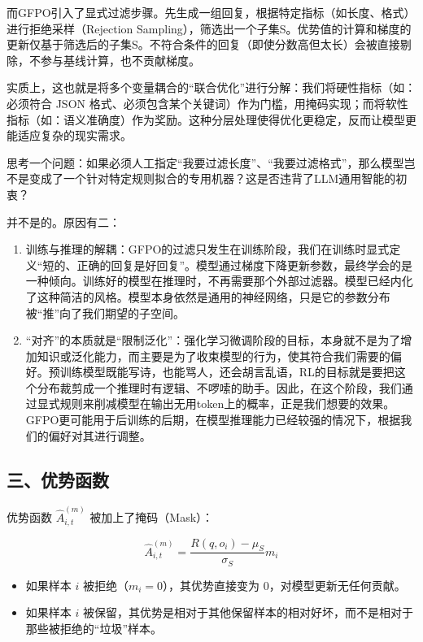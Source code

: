 而GFPO引入了显式过滤步骤。先生成一组回复，根据特定指标（如长度、格式）进行拒绝采样（Rejection Sampling），筛选出一个子集S。优势值的计算和梯度的更新仅基于筛选后的子集S。不符合条件的回复（即使分数高但太长）会被直接剔除，不参与基线计算，也不贡献梯度。

实质上，这也就是将多个变量耦合的``联合优化''进行分解：我们将硬性指标（如：必须符合 JSON 格式、必须包含某个关键词）作为门槛，用掩码实现；而将软性指标（如：语义准确度）作为奖励。这种分层处理使得优化更稳定，反而让模型更能适应复杂的现实需求。

思考一个问题：如果必须人工指定``我要过滤长度''、``我要过滤格式''，那么模型岂不是变成了一个针对特定规则拟合的专用机器？这是否违背了LLM通用智能的初衷？

并不是的。原因有二：

\begin{enumerate}
\def\labelenumi{\arabic{enumi}.}
\item
  训练与推理的解耦：GFPO的过滤只发生在训练阶段，我们在训练时显式定义``短的、正确的回复是好回复''。模型通过梯度下降更新参数，最终学会的是一种倾向。训练好的模型在推理时，不再需要那个外部过滤器。模型已经内化了这种简洁的风格。模型本身依然是通用的神经网络，只是它的参数分布被``推''向了我们期望的子空间。
\item
  ``对齐''的本质就是``限制泛化''：强化学习微调阶段的目标，本身就不是为了增加知识或泛化能力，而主要是为了收束模型的行为，使其符合我们需要的偏好。预训练模型既能写诗，也能骂人，还会胡言乱语，RL的目标就是要把这个分布裁剪成一个推理时有逻辑、不啰嗦的助手。因此，在这个阶段，我们通过显式规则来削减模型在输出无用token上的概率，正是我们想要的效果。GFPO更可能用于后训练的后期，在模型推理能力已经较强的情况下，根据我们的偏好对其进行调整。
\end{enumerate}

\hypertarget{ux4e09ux4f18ux52bfux51fdux6570}{%
\subsection{三、优势函数}\label{ux4e09ux4f18ux52bfux51fdux6570}}

优势函数 \(\hat{A}_{i,t}^{(m)}\) 被加上了掩码（Mask）：

\[
\hat{A}_{i,t}^{(m)} = \frac{R(q,o_i)-\mu_S}{\sigma_S} m_i
\]

\begin{itemize}
\tightlist
\item
  如果样本 \(i\) 被拒绝（\(m_i=0\)），其优势直接变为 \(0\)，对模型更新无任何贡献。
\item
  如果样本 \(i\) 被保留，其优势是相对于其他保留样本的相对好坏，而不是相对于那些被拒绝的``垃圾''样本。
\end{itemize}

